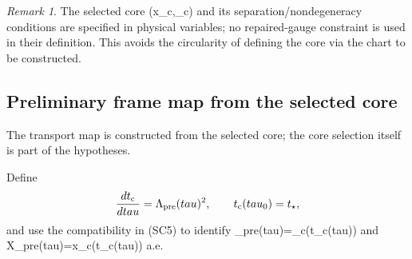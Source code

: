 \documentclass[11pt]{amsart}
\def\({}%
\def\){}%
\def\tau{tau}%
\theoremstyle{plain}
\theoremstyle{definition}
\theoremstyle{remark}
\newtheorem{remark}[remark]{Remark}
\begin{document}
\begin{remark}
The selected core \((x_{\rm c},\rho_{\rm c})\) and its separation/nondegeneracy
conditions are specified in physical variables; no repaired-gauge constraint is used in
their definition.  This avoids the circularity of defining the core via the chart
to be constructed.
\end{remark}

\subsection{Preliminary frame map from the selected core}\label{paper2:sec:preliminary-frame}

The transport map is constructed from the selected core; the core selection
itself is part of the hypotheses.

Define
\[
\frac{dt_{\rm c}}{d\tau}=\Lambda_{\rm pre}(\tau)^2,\qquad t_{\rm c}(\tau_0)=t_\star,
\]
and use the compatibility in \textup{(SC5)} to identify
\(\Lambda_{\rm pre}(\tau)=\rho_{\rm c}(t_{\rm c}(\tau))\) and
\(X_{\rm pre}(\tau)=x_{\rm c}(t_{\rm c}(\tau))\) a.e.
\end{document}
